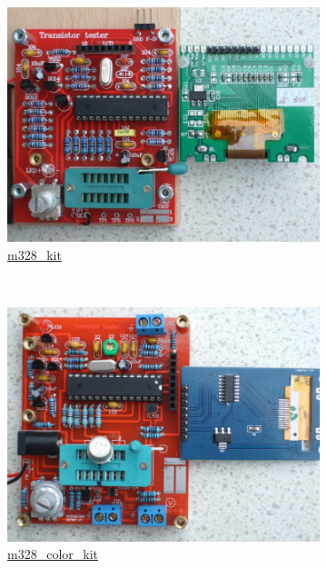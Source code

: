 \documentclass[pdftex,12pt,a4paper,english]{article}
\begin{document}
\begin{figure}[H]
  \begin{subfigure}[b]{.3\textwidth}
    \centering
    \includegraphics[width=1.\textwidth]{../PNG/Kit_ST7565b.jpg}
	  {\href{run:./trunk/mega328_st7565_kit/.}{m328\_kit}}
  \end{subfigure}
~
  \begin{subfigure}[b]{.3\textwidth}	%
    \centering
    \includegraphics[width=1.\textwidth]{../PNG/Kit_Color_b.jpg}
	  {\href{run:./trunk/mega328_color_kit/.}{m328\_color\_kit}}
  \end{subfigure}
~
  \begin{subfigure}[b]{.3\textwidth}	%
    \centering

\end{subfigure}
\end{figure}
\end{document}
